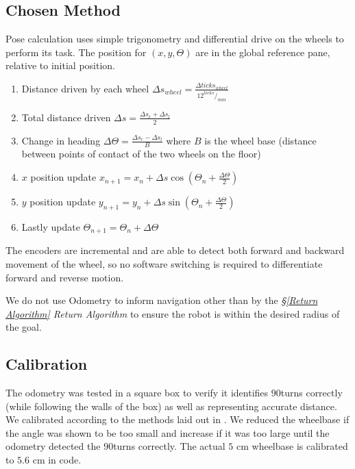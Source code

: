 \documentclass[11pt, a4paper]{article}
\begin{document}
\subsection{Chosen Method}

Pose calculation\cite{odo_used} uses simple trigonometry and differential drive on 
the wheels to perform its task. The position for 
${(x,y,\Theta)}$ are in the global reference pane, relative to initial position.

\begin{enumerate}

	\item Distance driven by each wheel 
          ${\Delta s_{wheel} = \frac {\Delta ticks_{wheel} } {12 ^{ticks}/_{mm}}}$
	\item Total distance driven ${\Delta s = \frac{\Delta s_{r} + \Delta s_{l} }{2}}$
	\item Change in heading ${\Delta\Theta = \frac{ \Delta s_{r} - \Delta s_{l} }{B}}$ 
          where $B$ is the wheel base (distance between points of contact of the two wheels on the floor)
	\item $x$ position update ${x_{n+1} = x_{n} + \Delta s \cos (\Theta_n + \frac{\Delta\Theta}{2})}$
	\item $y$ position update ${y_{n+1} = y_{n} + \Delta s \sin (\Theta_n + \frac{\Delta\Theta}{2})}$
        \item Lastly update ${\Theta_{n+1} = \Theta_{n} + \Delta\Theta}$


\end{enumerate}

The encoders are incremental and are able to detect both forward and backward movement 
of the wheel, so no software switching is required to differentiate forward and reverse
motion.

We do not use Odometry to inform navigation other than by the \textit{\S\ref{Return Algorithm}
 Return Algorithm} to ensure the robot is within the desired radius of the goal.

\subsection{Calibration}

The odometry was tested in a square box to verify it identifies $90$\degree turns correctly 
(while following the walls of the box) as well as representing accurate distance. We calibrated 
according to the methods laid out in \cite{odo_calibration}. We reduced the wheelbase if the 
angle was shown to be too small and increase if it was too large until  the odometry detected 
the  $90$\degree turns correctly. The actual $5$ cm wheelbase is calibrated to $5.6$ cm in code.
\end{document}
